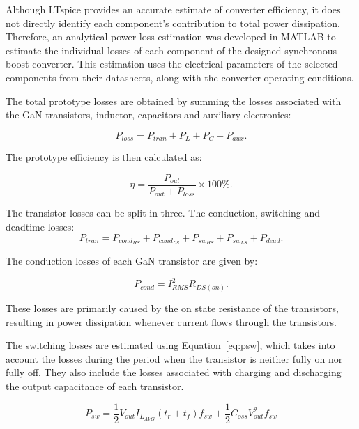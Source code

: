         Although LTspice provides an accurate estimate of converter efficiency, it does not directly identify each component's contribution to total power dissipation. Therefore, an analytical power loss estimation was developed in MATLAB to estimate the individual losses of each component of the designed synchronous boost converter. This estimation uses the electrical parameters of the selected components from their datasheets, along with the converter operating conditions.

        The total prototype losses are obtained by summing the losses associated with the GaN transistors, inductor, capacitors and auxiliary electronics:

        \begin{equation}
        P_{loss}=P_{tran}+P_{L}+P_{C}+P_{aux} .
        \end{equation}

        The prototype efficiency is then calculated as:

        \begin{equation}
        \eta=\frac{P_{out}}{P_{out}+P_{loss}}\times100\% .
        \end{equation}

        The transistor losses can be split in three. The conduction, switching and deadtime losses:
        \begin{equation}
            P_{tran}=P_{cond_{HS}}+P_{cond_{LS}}+P_{sw_{HS}}+P_{sw_{LS}}+P_{dead}.
        \end{equation}

        The conduction losses of each GaN transistor are given by:

        \begin{equation}
        P_{cond}=I_{RMS}^{2}R_{DS(on)} .
        \end{equation}

        These losses are primarily caused by the on state resistance of the transistors, resulting in power dissipation whenever current flows through the transistors. 

        The switching losses are estimated using Equation~\ref{eq:psw}, 
        which takes into account the losses during the period when the transistor is neither fully on nor fully off. They also include the losses associated with charging and discharging the output capacitance of each transistor.

        \begin{equation}
        P_{sw}=\frac{1}{2}V_{out}I_{L_{AVG}}(t_r+t_f)f_{sw} + \frac{1}{2}C_{oss}V_{out}^{2}f_{sw}
        \label{eq:psw}
        \end{equation}

